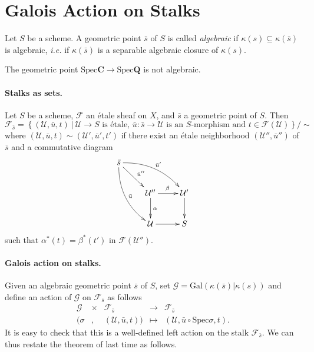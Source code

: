 \section{Galois Action on Stalks}
\label{section:GaloisActionOnStalks}

\begin{definition}
Let $S$ be a scheme. A geometric point $\bar s$ of $S$ is called 
\emph{algebraic} if $\kappa(s) \subseteq \kappa(\bar s)$ is algebraic, {\it 
i.e.} if $\kappa(\bar s)$ is a separable algebraic closure of $\kappa(s)$.
\end{definition}

\begin{example}
The geometric point $\text{Spec} \mathbf{C} \to \text{Spec} \mathbf{Q}$ is not 
algebraic.
\end{example}

\paragraph{Stalks as sets.}
Let $S$ be a scheme, $\mathcal{F}$ an \'etale sheaf on $X$, and $\bar s$ a 
geometric point of $S$. Then 
$$
\mathcal{F}_{\bar s} = \left\{
(\mathcal{U},\bar u, t) \ \big| \ \mathcal{U} \to S \text{ is \'etale, } \bar u 
: \bar s \to \mathcal{U} \text{ is an $S$-morphism and } t \in 
\mathcal{F}(\mathcal{U})
\right\}
\big/\sim
$$
where $(\mathcal{U},\bar u, t) \sim (\mathcal{U}',\bar u', t')$ if there exist 
an \'etale neighborhood $(\mathcal{U}'',\bar u'')$ of $\bar s$ and a 
commutative diagram
$$
\xymatrix{
\bar s \ar^{\bar u''}[rd] \ar^{\bar u'}@/^1pc/[rrd] \ar^{\bar u}@/_1pc/[rdd] \\
& \mathcal{U}'' \ar^{\beta}[r] \ar^{\alpha}[d] & \mathcal{U}' \ar[d] \\
& \mathcal{U} \ar[r] & S
}
$$
such that $\alpha^*(t) = \beta^*(t')$ in $\mathcal{F}(\mathcal{U}'')$.

\paragraph{Galois action on stalks.}
Given an algebraic geometric point $\bar s$ of $S$, set $\mathcal{G} = 
\text{Gal}(\kappa(\bar s) | \kappa(s))$ and define an action of $\mathcal{G}$ 
on $\mathcal{F}_{\bar s}$ as follows
$$
\begin{array}{ccccl}
\mathcal{G} & \times & \mathcal{F}_{\bar s} & \longrightarrow & 
\mathcal{F}_{\bar s} \\
(\sigma & , & (\mathcal{U},\bar u, t)) & \longmapsto & (\mathcal{U},\bar u 
\circ \text{Spec} \sigma, t).
\end{array}
$$
It is easy to check that this is a well-defined left action on the stalk 
$\mathcal{F}_{\bar s}$. We can thus restate the theorem of last time as follows.

